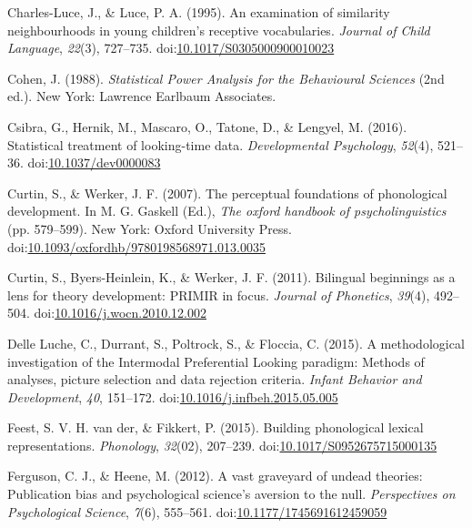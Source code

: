 \documentclass[man]{apa6}
\theoremstyle{definition}
\theoremstyle{definition}
\theoremstyle{definition}
\theoremstyle{remark}
\begin{document}
\hypertarget{ref-CharlesLuce1995}{}
Charles-Luce, J., \& Luce, P. A. (1995). An examination of similarity
neighbourhoods in young children's receptive vocabularies. \emph{Journal
of Child Language}, \emph{22}(3), 727--735.
doi:\href{https://doi.org/10.1017/S0305000900010023}{10.1017/S0305000900010023}

\hypertarget{ref-cohen}{}
Cohen, J. (1988). \emph{Statistical Power Analysis for the Behavioural
Sciences} (2nd ed.). New York: Lawrence Earlbaum Associates.

\hypertarget{ref-Csibra2016}{}
Csibra, G., Hernik, M., Mascaro, O., Tatone, D., \& Lengyel, M. (2016).
Statistical treatment of looking-time data. \emph{Developmental
Psychology}, \emph{52}(4), 521--36.
doi:\href{https://doi.org/10.1037/dev0000083}{10.1037/dev0000083}

\hypertarget{ref-Curtin2007}{}
Curtin, S., \& Werker, J. F. (2007). The perceptual foundations of
phonological development. In M. G. Gaskell (Ed.), \emph{The oxford
handbook of psycholinguistics} (pp. 579--599). New York: Oxford
University Press.
doi:\href{https://doi.org/10.1093/oxfordhb/9780198568971.013.0035}{10.1093/oxfordhb/9780198568971.013.0035}

\hypertarget{ref-Curtin2011}{}
Curtin, S., Byers-Heinlein, K., \& Werker, J. F. (2011). Bilingual
beginnings as a lens for theory development: PRIMIR in focus.
\emph{Journal of Phonetics}, \emph{39}(4), 492--504.
doi:\href{https://doi.org/10.1016/j.wocn.2010.12.002}{10.1016/j.wocn.2010.12.002}

\hypertarget{ref-DelleLuche2015}{}
Delle Luche, C., Durrant, S., Poltrock, S., \& Floccia, C. (2015). A
methodological investigation of the Intermodal Preferential Looking
paradigm: Methods of analyses, picture selection and data rejection
criteria. \emph{Infant Behavior and Development}, \emph{40}, 151--172.
doi:\href{https://doi.org/10.1016/j.infbeh.2015.05.005}{10.1016/j.infbeh.2015.05.005}

\hypertarget{ref-vanderFeest2015}{}
Feest, S. V. H. van der, \& Fikkert, P. (2015). Building phonological
lexical representations. \emph{Phonology}, \emph{32}(02), 207--239.
doi:\href{https://doi.org/10.1017/S0952675715000135}{10.1017/S0952675715000135}

\hypertarget{ref-Ferguson2012}{}
Ferguson, C. J., \& Heene, M. (2012). A vast graveyard of undead
theories: Publication bias and psychological science's aversion to the
null. \emph{Perspectives on Psychological Science}, \emph{7}(6),
555--561.
doi:\href{https://doi.org/10.1177/1745691612459059}{10.1177/1745691612459059}
\end{document}
